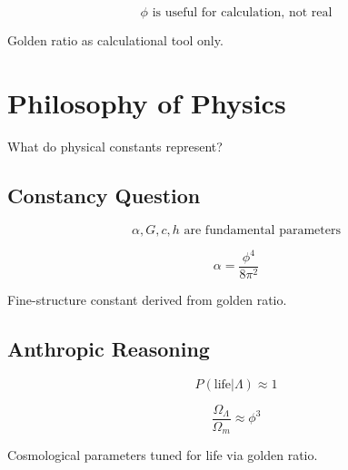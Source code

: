 \begin{proposition}
\label{prop:instrumental-golden}
\begin{equation}
\phi \text{ is useful for calculation, not real}
\end{equation}

Golden ratio as calculational tool only.
\end{proposition}

\section{Philosophy of Physics}

What do physical constants represent?

\subsection{Constancy Question}

\begin{definition}
\label{def:constants}
\begin{equation}
\alpha, G, c, h \text{ are fundamental parameters}
\end{equation}
\end{definition}

\begin{theorem}
\label{thm:golden-constants}
\begin{equation}
\alpha = \frac{\phi^4}{8\pi^2}
\end{equation}

Fine-structure constant derived from golden ratio.
\end{theorem}

\subsection{Anthropic Reasoning}

\begin{equation}
P(\text{life}|\Lambda) \approx 1
\end{equation}

\begin{proposition}
\label{prop:golden-anthropic}
\begin{equation}
\frac{\Omega_\Lambda}{\Omega_m} \approx \phi^3
\end{equation}

Cosmological parameters tuned for life via golden ratio.
\end{proposition}

